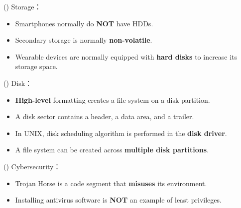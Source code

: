 \begin{theorem}{()} Storage： \begin{itemize}
        \item Smartphones normally do \textbf{NOT} have HDDs.
        \item Secondary storage is normally \textbf{non-volatile}.
        \item Wearable devices are normally equipped with \textbf{hard disks} to increase its storage space.
    \end{itemize}
\end{theorem}

\begin{theorem}{()} Disk： \begin{itemize}
        \item \textbf{High-level} formatting creates a file system on a disk partition.
        \item A disk sector contains a header, a data area, and a trailer.
        \item In UNIX, disk scheduling algorithm is performed in the \textbf{disk driver}.
        \item A file system can be created across \textbf{multiple disk partitions}.
    \end{itemize}
\end{theorem}

\begin{theorem}{()} Cybersecurity： \begin{itemize}
        \item Trojan Horse is a code segment that \textbf{misuses} its environment.
        \item Installing antivirus software is \textbf{NOT} an example of least privileges.
    \end{itemize}
\end{theorem}

